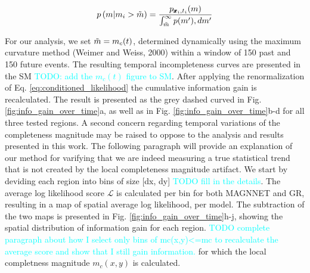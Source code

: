 \documentclass[pdflatex]{sn-jnl}
\newcommand{\neri}[1]{{\textcolor{cyan}{#1}}}
\begin{document}
\begin{equation}
    p \left( m \vert m_i > \Tilde{m} \right) = \frac{p_{\pmb{x}_i, t_i}(m)} {\int_{\Tilde{m}}^{\infty} p(m') ,dm'}
    \label{eq:conditioned_likelihood}
\end{equation}

For our analysis, we set $\Tilde{m} = m_c(t)$, determined dynamically using the maximum curvature method (Weimer and Weiss, 2000) within a window of 150 past and 150 future events. The resulting temporal incompleteness curves are presented in the SM \neri{TODO: add the $m_c(t)$ figure to SM}. After applying the renormalization of Eq. \ref{eq:conditioned_likelihood} the cumulative information gain is recalculated. The result is presented as the grey dashed curved in Fig.  \ref{fig:info_gain_over_time}a, as well as in Fig. \ref{fig:info_gain_over_time}b-d for all three tested regions.
\newline
A second concern regarding temporal variations of the completeness magnitude may be raised to oppose to the analysis and results presented in this work. The following paragraph will provide an explanation of our method for varifying that we are indeed measuring a true statistical trend that is not created by the local completeness magnitude artifact. We start by deviding each region into bins of size [dx, dy] \neri{TODO fill in the details}. The average log likelihood score $\mathcal{L}$ is calculated per bin for both MAGNNET and GR, resulting in a map of spatial average log likelihood, per model. The subtraction of the two maps is presented in Fig. \ref{fig:info_gain_over_time}h-j, showing the spatial distribution of information gain for each region. 
\neri{TODO complete paragraph about how I select only bins of mc(x,y)<=mc to recalculate the average score and show that I still gain information.}
for which the local completness magnitude $m_c(x, y)$ is calculated. 





\let\oldbibliography\thebibliography
\renewcommand{\thebibliography}[1]{%
  \oldbibliography{#1}%
  \setlength{\itemsep}{10pt}%
}
% 
% 
\newpage

\end{document}
